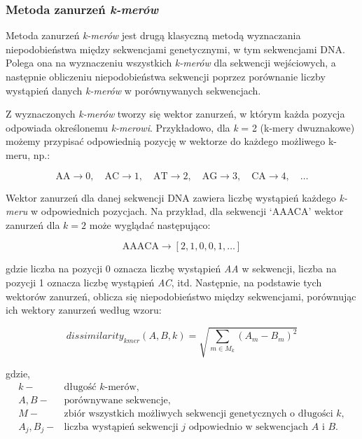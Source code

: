         \subsubsection{Metoda zanurzeń \textit{k-merów}}
            Metoda zanurzeń \textit{k-merów} jest drugą klasyczną metodą wyznaczania niepodobieństwa między sekwencjami genetycznymi, w tym sekwencjami DNA. Polega ona na wyznaczeniu wszystkich \textit{k-merów} dla sekwencji wejściowych, a następnie obliczeniu niepodobieństwa sekwencji poprzez porównanie liczby wystąpień danych \textit{k-merów} w porównywanych sekwencjach.

            Z wyznaczonych \textit{k-merów} tworzy się wektor zanurzeń, w którym każda pozycja odpowiada określonemu \textit{k-merowi}. Przykładowo, dla \textit{k} = 2 (k-mery dwuznakowe) możemy przypisać odpowiednią pozycję w wektorze do każdego możliwego k-meru, np.:
            
            \[
            \text{AA} \to 0, \quad \text{AC} \to 1, \quad \text{AT} \to 2, \quad \text{AG} \to 3, \quad \text{CA} \to 4, \quad \dots
            \]
            
            Wektor zanurzeń dla danej sekwencji DNA zawiera liczbę wystąpień każdego \textit{k-meru} w odpowiednich pozycjach. Na przykład, dla sekwencji `AAACA' wektor zanurzeń dla $k=2$ może wyglądać następująco:
            
            \[
            \text{AAACA} \to [2, 1, 0, 0, 1, \dots]
            \]
            
            gdzie liczba na pozycji 0 oznacza liczbę wystąpień \textit{AA} w sekwencji, liczba na pozycji 1 oznacza liczbę wystąpień \textit{AC}, itd. Następnie, na podstawie tych wektorów zanurzeń, oblicza się niepodobieństwo między sekwencjami, porównując ich wektory zanurzeń według wzoru:

            \begin{equation}
                dissimilarity_{kmer}(A, B, k) = \sqrt{\sum_{m \in M_{k}} (A_m - B_m)^{2}}
            \end{equation}

            gdzie,
            \begin{align*} 
                k -& \text{długość $k$-merów}, \\
                A, B -& \text{porównywane sekwencje}, \\
                M -& \text{zbiór wszystkich możliwych sekwencji genetycznych o długości $k$}, \\
                A_j, B_j -& \text{liczba wystąpień sekwencji } j \text{ odpowiednio w sekwencjach } A \text{ i } B. \\
            \end{align*}

